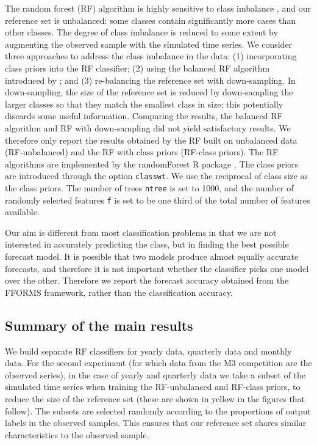 \documentclass[11pt,a4paper,]{article}
\begin{document}
The random forest (RF) algorithm is highly sensitive to class imbalance \autocite{breiman2001random}, and our reference set is unbalanced: some classes contain significantly more cases than other classes. The degree of class imbalance is reduced to some extent by augmenting the observed sample with the simulated time series. We consider three approaches to address the class imbalance in the data: (1) incorporating class priors into the RF classifier; (2) using the balanced RF algorithm introduced by \textcite{chen2004using}; and (3) re-balancing the reference set with down-sampling. In down-sampling, the size of the reference set is reduced by down-sampling the larger classes so that they match the smallest class in size; this potentially discards some useful information. Comparing the results, the balanced RF algorithm and RF with down-sampling did not yield satisfactory results. We therefore only report the results obtained by the RF built on unbalanced data (RF-unbalanced) and the RF with class priors (RF-class priors). The RF algorithms are implemented by the randomForest R package \autocites{liaw2002randomforest}{rfpkg}. The class priors are introduced through the option \texttt{classwt}. We use the reciprocal of class size as the class priors. The number of trees \texttt{ntree} is set to 1000, and the number of randomly selected features \texttt{f} is set to be one third of the total number of features available.

Our aim is different from most classification problems in that we are not interested in accurately predicting the class, but in finding the best possible forecast model. It is possible that two models produce almost equally accurate forecasts, and therefore it is not important whether the classifier picks one model over the other. Therefore we report the forecast accuracy obtained from the FFORMS framework, rather than the classification accuracy.

\hypertarget{sec:results}{%
\subsection{Summary of the main results}\label{sec:results}}

We build separate RF classifiers for yearly data, quarterly data and monthly data. For the second experiment (for which data from the M3 competition are the observed series), in the case of yearly and quarterly data we take a subset of the simulated time series when training the RF-unbalanced and RF-class priors, to reduce the size of the reference set (these are shown in yellow in the figures that follow). The subsets are selected randomly according to the proportions of output labels in the observed samples. This ensures that our reference set shares similar characteristics to the observed sample.
\end{document}

